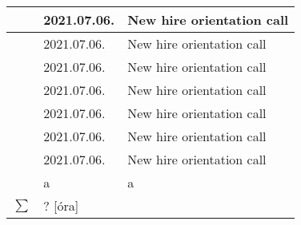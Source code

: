 \documentclass[10pt,a4paper,oneside]{report}
\newcounter{magicrownumbers}
\newcommand\rownum{\stepcounter{magicrownumbers}\arabic{magicrownumbers}}
\begin{document}
\begin{table}[h]
\begin{tabular}{| c | p{3 cm} | p{10 cm} |}
	\rownum & 2021.07.06. & New hire orientation call \\ \hline
	\rownum & 2021.07.06. & New hire orientation call \\ \hline
	\rownum & 2021.07.06. & New hire orientation call \\ \hline
	\rownum & 2021.07.06. & New hire orientation call \\ \hline
	\rownum & 2021.07.06. & New hire orientation call \\ \hline
	\rownum & 2021.07.06. & New hire orientation call \\ \hline
	\rownum & 2021.07.06. & New hire orientation call \\ \hline
	\rownum & a & a \\ \hline \hline
	$\sum$ & ? [óra]& \\ \hline
	\end{tabular}
\end{table}
\end{document}
